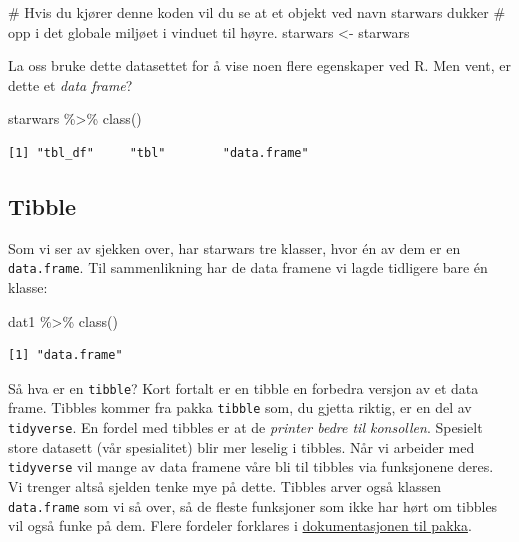 \documentclass[
  letterpaper,
  DIV=11,
  numbers=noendperiod]{scrreprt}
\newenvironment{Shaded}{\begin{snugshade}}{\end{snugshade}}
\newcommand{\CommentTok}[1]{\textcolor[rgb]{0.37,0.37,0.37}{#1}}
\newcommand{\FunctionTok}[1]{\textcolor[rgb]{0.28,0.35,0.67}{#1}}
\newcommand{\NormalTok}[1]{\textcolor[rgb]{0.00,0.23,0.31}{#1}}
\newcommand{\OtherTok}[1]{\textcolor[rgb]{0.00,0.23,0.31}{#1}}
\newcommand{\SpecialCharTok}[1]{\textcolor[rgb]{0.37,0.37,0.37}{#1}}
\begin{document}
\begin{Shaded}
\begin{Highlighting}[]
\CommentTok{\# Hvis du kjører denne koden vil du se at et objekt ved navn \textasciigrave{}starwars\textasciigrave{} dukker }
\CommentTok{\# opp i det globale miljøet i vinduet til høyre.}
\NormalTok{starwars }\OtherTok{\textless{}{-}}\NormalTok{ starwars}
\end{Highlighting}
\end{Shaded}

La oss bruke dette datasettet for å vise noen flere egenskaper ved R.
Men vent, er dette et \emph{data frame}?

\begin{Shaded}
\begin{Highlighting}[]
\NormalTok{starwars }\SpecialCharTok{\%\textgreater{}\%} \FunctionTok{class}\NormalTok{()}
\end{Highlighting}
\end{Shaded}

\begin{verbatim}
[1] "tbl_df"     "tbl"        "data.frame"
\end{verbatim}

\hypertarget{tibble}{%
\subsection{Tibble}\label{tibble}}

Som vi ser av sjekken over, har starwars tre klasser, hvor én av dem er
en \texttt{data.frame}. Til sammenlikning har de data framene vi lagde
tidligere bare én klasse:

\begin{Shaded}
\begin{Highlighting}[]
\NormalTok{dat1 }\SpecialCharTok{\%\textgreater{}\%} \FunctionTok{class}\NormalTok{()}
\end{Highlighting}
\end{Shaded}

\begin{verbatim}
[1] "data.frame"
\end{verbatim}

Så hva er en \texttt{tibble}? Kort fortalt er en tibble en forbedra
versjon av et data frame. Tibbles kommer fra pakka \texttt{tibble} som,
du gjetta riktig, er en del av \texttt{tidyverse}. En fordel med tibbles
er at de \emph{printer bedre til konsollen}. Spesielt store datasett
(vår spesialitet) blir mer leselig i tibbles. Når vi arbeider med
\texttt{tidyverse} vil mange av data framene våre bli til tibbles via
funksjonene deres. Vi trenger altså sjelden tenke mye på dette. Tibbles
arver også klassen \texttt{data.frame} som vi så over, så de fleste
funksjoner som ikke har hørt om tibbles vil også funke på dem. Flere
fordeler forklares i
\href{https://tibble.tidyverse.org/}{dokumentasjonen til pakka}.
\end{document}
